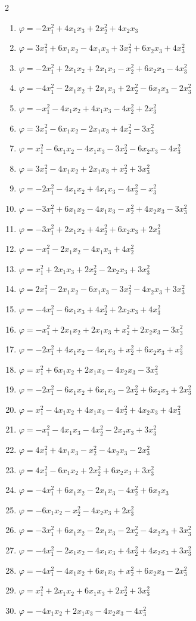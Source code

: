 \begin{multicols}{2}\raggedright
\begin{enumerate}[label=\arabic*., leftmargin=*]
\item $\varphi=-2x_1^2+4x_1x_3+2x_2^2+4x_2x_3$
\item $\varphi=3x_1^2+6x_1x_2-4x_1x_3+3x_2^2+6x_2x_3+4x_3^2$
\item $\varphi=-2x_1^2+2x_1x_2+2x_1x_3-x_2^2+6x_2x_3-4x_3^2$
\item $\varphi=-4x_1^2-2x_1x_2+2x_1x_3+2x_2^2-6x_2x_3-2x_3^2$
\item $\varphi=-x_1^2-4x_1x_2+4x_1x_3-4x_2^2+2x_3^2$
\item $\varphi=3x_1^2-6x_1x_2-2x_1x_3+4x_2^2-3x_3^2$
\item $\varphi=x_1^2-6x_1x_2-4x_1x_3-3x_2^2-6x_2x_3-4x_3^2$
\item $\varphi=3x_1^2-4x_1x_2+2x_1x_3+x_2^2+3x_3^2$
\item $\varphi=-2x_1^2-4x_1x_2+4x_1x_3-4x_2^2-x_3^2$
\item $\varphi=-3x_1^2+6x_1x_2-4x_1x_3-x_2^2+4x_2x_3-3x_3^2$
\item $\varphi=-3x_1^2+2x_1x_2+4x_2^2+6x_2x_3+2x_3^2$
\item $\varphi=-x_1^2-2x_1x_2-4x_1x_3+4x_2^2$
\item $\varphi=x_1^2+2x_1x_3+2x_2^2-2x_2x_3+3x_3^2$
\item $\varphi=2x_1^2-2x_1x_2-6x_1x_3-3x_2^2-4x_2x_3+3x_3^2$
\item $\varphi=-4x_1^2-6x_1x_3+4x_2^2+2x_2x_3+4x_3^2$
\item $\varphi=-x_1^2+2x_1x_2+2x_1x_3+x_2^2+2x_2x_3-3x_3^2$
\item $\varphi=-2x_1^2+4x_1x_2-4x_1x_3+x_2^2+6x_2x_3+x_3^2$
\item $\varphi=x_1^2+6x_1x_2+2x_1x_3-4x_2x_3-3x_3^2$
\item $\varphi=-2x_1^2-6x_1x_2+6x_1x_3-2x_2^2+6x_2x_3+2x_3^2$
\item $\varphi=x_1^2-4x_1x_2+4x_1x_3-4x_2^2+4x_2x_3+4x_3^2$
\item $\varphi=-x_1^2-4x_1x_3-4x_2^2-2x_2x_3+3x_3^2$
\item $\varphi=4x_1^2+4x_1x_3-x_2^2-4x_2x_3-2x_3^2$
\item $\varphi=4x_1^2-6x_1x_2+2x_2^2+6x_2x_3+3x_3^2$
\item $\varphi=-4x_1^2+6x_1x_2-2x_1x_3-4x_2^2+6x_2x_3$
\item $\varphi=-6x_1x_2-x_2^2-4x_2x_3+2x_3^2$
\item $\varphi=-3x_1^2+6x_1x_2-2x_1x_3-2x_2^2-4x_2x_3+3x_3^2$
\item $\varphi=-4x_1^2-2x_1x_2-4x_1x_3+4x_2^2+4x_2x_3+3x_3^2$
\item $\varphi=-4x_1^2-4x_1x_2+6x_1x_3+x_2^2+6x_2x_3-2x_3^2$
\item $\varphi=x_1^2+2x_1x_2+6x_1x_3+2x_2^2+3x_3^2$
\item $\varphi=-4x_1x_2+2x_1x_3-4x_2x_3-4x_3^2$
\end{enumerate}
\end{multicols}

